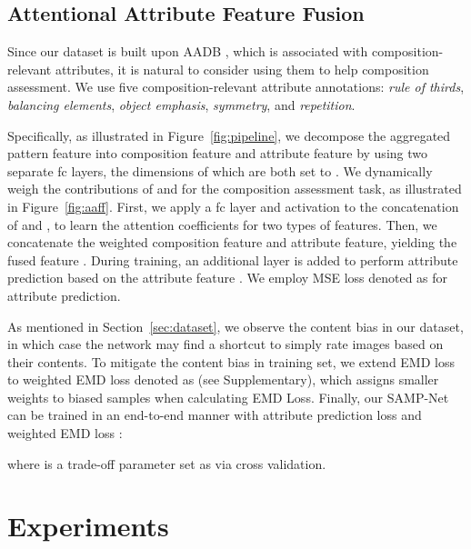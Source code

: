 \documentclass{bmvc2k}
\begin{document}
\subsection{Attentional Attribute Feature Fusion}
\label{aaff}
Since our dataset is built upon AADB \cite{Kong2016PhotoAR}, which is associated with composition-relevant attributes, it is natural to consider using them to help composition assessment. We use five composition-relevant attribute annotations: \emph{rule of thirds}, \emph{balancing elements}, \emph{object emphasis}, \emph{symmetry}, and \emph{repetition}. 

Specifically, as illustrated in Figure~\ref{fig:pipeline}, we decompose the aggregated pattern feature  into composition feature  and attribute feature  by using two separate fc layers, the dimensions of which are both set to . We dynamically weigh the contributions of  and  for the composition assessment task, as illustrated in Figure~\ref{fig:aaff}. First, we apply a fc layer and  activation to the concatenation of   and , to learn the attention coefficients  for two types of features. Then, we concatenate the weighted composition feature and attribute feature, yielding the fused feature . During training, an additional layer is added to perform attribute prediction based on the attribute feature . We employ MSE loss denoted as  for attribute prediction.

As mentioned in Section~\ref{sec:dataset}, we observe the content bias in our dataset, in which case the network may find a shortcut to simply rate images based on their contents.
To mitigate the content bias in training set, we extend EMD loss to weighted EMD loss denoted as   (see Supplementary), which assigns smaller weights to biased samples when calculating EMD Loss.
Finally, our SAMP-Net can be trained in an end-to-end manner with attribute prediction loss  and weighted EMD loss :

where  is a trade-off parameter set as  via cross validation.





\vspace{-3mm}
\section{Experiments}
\end{document}
